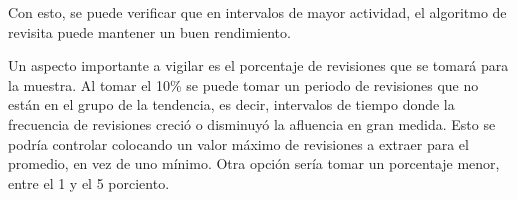 Con esto, se puede verificar que en intervalos de mayor actividad, el algoritmo de revisita puede mantener un buen rendimiento.

Un aspecto importante a vigilar es el porcentaje de revisiones que se tomará para la muestra.
Al tomar el 10\% se puede tomar un periodo de revisiones que no están en el grupo de la tendencia, es decir, intervalos de tiempo donde la frecuencia de revisiones creció o disminuyó la afluencia en gran medida.
Esto se podría controlar colocando un valor máximo de revisiones a extraer para el promedio, en vez de uno mínimo.
Otra opción sería tomar un porcentaje menor, entre el 1 y el 5 porciento.
